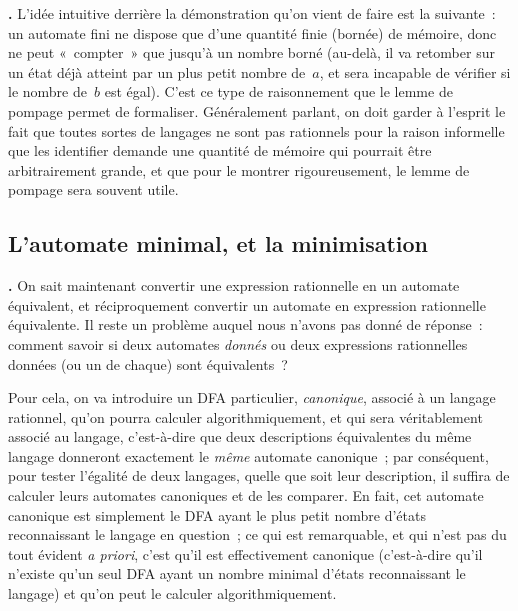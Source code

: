 \documentclass[12pt,a4paper]{article}
\theoremstyle{definition}
\newcommand\thingy{%
\refstepcounter{comcnt}\medskip\noindent\textbf{\thecomcnt.} }
\begin{document}
\thingy L'idée intuitive derrière la démonstration qu'on vient de
faire est la suivante : un automate fini ne dispose que d'une quantité
finie (bornée) de mémoire, donc ne peut « compter » que jusqu'à un
nombre borné (au-delà, il va retomber sur un état déjà atteint par un
plus petit nombre de $a$, et sera incapable de vérifier si le nombre
de $b$ est égal).  C'est ce type de raisonnement que le lemme de
pompage permet de formaliser.  Généralement parlant, on doit garder à
l'esprit le fait que toutes sortes de langages ne sont pas rationnels
pour la raison informelle que les identifier demande une quantité de
mémoire qui pourrait être arbitrairement grande, et que pour le
montrer rigoureusement, le lemme de pompage sera souvent utile.


\subsection{L'automate minimal, et la minimisation}

\thingy On sait maintenant convertir une expression rationnelle en un
automate équivalent, et réciproquement convertir un automate en
expression rationnelle équivalente.  Il reste un problème auquel nous
n'avons pas donné de réponse : comment savoir si deux automates
\emph{donnés} ou deux expressions rationnelles données (ou un de
chaque) sont équivalents ?

\smallskip

Pour cela, on va introduire un DFA particulier, \emph{canonique},
associé à un langage rationnel, qu'on pourra calculer
algorithmiquement, et qui sera véritablement associé au langage,
c'est-à-dire que deux descriptions équivalentes du même langage
donneront exactement le \emph{même} automate canonique ; par
conséquent, pour tester l'égalité de deux langages, quelle que soit
leur description, il suffira de calculer leurs automates canoniques et
de les comparer.  En fait, cet automate canonique est simplement le
DFA ayant le plus petit nombre d'états reconnaissant le langage en
question ; ce qui est remarquable, et qui n'est pas du tout évident
\textit{a priori}, c'est qu'il est effectivement canonique
(c'est-à-dire qu'il n'existe qu'un seul DFA ayant un nombre minimal
d'états reconnaissant le langage) et qu'on peut le calculer
algorithmiquement.
\end{document}
